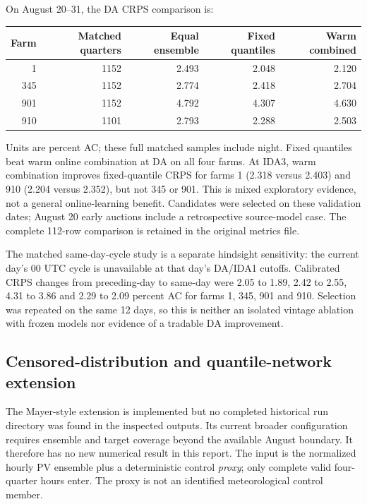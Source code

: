 On August 20--31, the DA CRPS comparison is:
\begin{center}\small
\begin{tabular}{rrrrr}
\toprule Farm & Matched quarters & Equal ensemble & Fixed quantiles & Warm combined\\\midrule
1 & 1152 & 2.493 & 2.048 & 2.120\\
345 & 1152 & 2.774 & 2.418 & 2.704\\
901 & 1152 & 4.792 & 4.307 & 4.630\\
910 & 1101 & 2.793 & 2.288 & 2.503\\
\bottomrule\end{tabular}\end{center}
Units are percent AC; these full matched samples include night. Fixed quantiles
beat warm online combination at DA on all four farms. At IDA3, warm combination
improves fixed-quantile CRPS for farms 1 (2.318 versus 2.403) and 910 (2.204
versus 2.352), but not 345 or 901. This is mixed exploratory evidence, not a
general online-learning benefit. Candidates were selected on these validation
dates; August 20 early auctions include a retrospective source-model case.
The complete 112-row comparison is retained in the original metrics file.

The matched same-day-cycle study is a separate hindsight sensitivity: the
current day's 00 UTC cycle is unavailable at that day's DA/IDA1 cutoffs.
Calibrated CRPS changes from preceding-day to same-day were 2.05 to 1.89, 2.42
to 2.55, 4.31 to 3.86 and 2.29 to 2.09 percent AC for farms 1, 345, 901 and
910. Selection was repeated on the same 12 days, so this is neither an isolated
vintage ablation with frozen models nor evidence of a tradable DA improvement.

\subsection{Censored-distribution and quantile-network extension}
The Mayer-style extension is implemented but no completed historical run
directory was found in the inspected outputs. Its current broader configuration
requires ensemble and target coverage beyond the available August boundary.
It therefore has no new numerical result in this report. The input is the
normalized hourly PV ensemble plus a deterministic control \emph{proxy}; only
complete valid four-quarter hours enter. The proxy is not an identified
meteorological control member.

